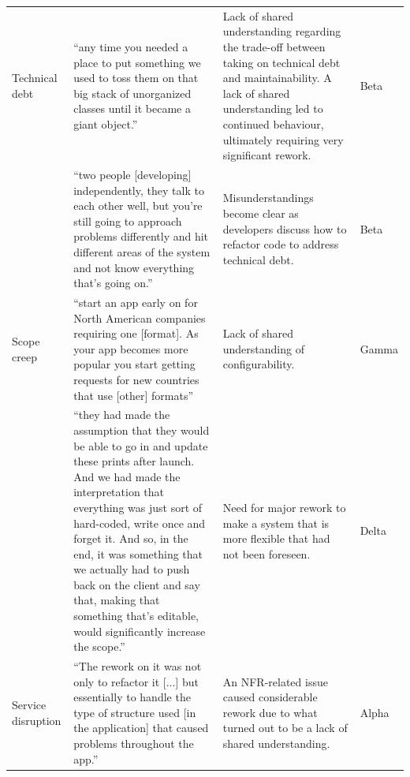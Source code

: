 \documentclass[smallextended]{svjour3}
\begin{document}
\begin{longtable}{P{1.5cm}p{4.8cm}p{3.3cm}p{1.3cm}}
Technical debt & ``any time you needed a place to put something we used to toss them on that big stack of
unorganized classes until it became a giant object.'' & Lack of shared understanding regarding the trade-off between taking on technical debt and maintainability. A lack of shared understanding led to continued behaviour, ultimately requiring very significant rework. & Beta \\
\addlinespace & ``two people [developing] independently, they talk to each other well, but you’re still going to approach problems differently and hit different areas of the system and not know everything that’s going on.'' & Misunderstandings become clear as developers discuss how to refactor code to address technical debt. & Beta \\
\addlinespace

Scope creep & ``start an app early on for North American companies requiring one [format]. As your app becomes more popular you start getting requests for new countries that use [other] formats'' & Lack of shared understanding of configurability. & Gamma \\
\addlinespace & ``they had made the assumption that they would be able to go in and update these prints after launch. And we had made the interpretation that everything was just sort of hard-coded, write once and forget it. And so, in the end, it was something that we actually had to push back on the client and say that, making that something that’s editable, would significantly increase the scope.'' & Need for major rework to make a system that is more flexible that had not been foreseen. & Delta \\
\addlinespace
Service disruption & ``The rework on it was not only to refactor it [...] but essentially to handle the type of
structure used [in the application] that caused problems throughout the app.'' & An NFR-related issue caused considerable rework due to what turned out to be a lack of shared understanding. & Alpha \\
\end{longtable}
\endgroup 
\end{document}
